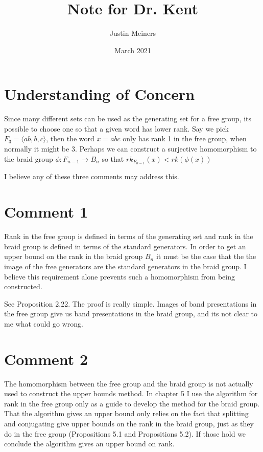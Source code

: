 \documentclass{article}
\title{Note for Dr. Kent}
\author{Justin Meiners}
\date{March 2021}
\begin{document}
\maketitle

\section*{Understanding of Concern}

Since many different sets can be used as the generating
set for a free group, its possible to choose
one so that a given word has lower rank.
Say we pick $F_{3} = \langle ab, b, c \rangle$,
then the word $x = abc$ only has rank 1 in the free group, when normally it might be 3.
Perhaps we can construct a surjective homomorphism to the braid group $\phi \colon F_{n-1} \rightarrow B_{n}$ 
so that $rk_{F_{n-1}}(x) < rk(\phi(x))$ 

I believe any of these three comments may address this. 

\section*{Comment 1}

Rank in the free group is defined in terms of the generating set
and rank in the braid group is defined in terms of the standard generators.
In order to get an upper bound on the rank in the braid 
group $B_{n}$ it must be the case
that the the image of the free generators
are the standard generators in the braid group.
I believe this requirement alone prevents such
a homomorphism from being constructed.

See Proposition 2.22.
The  proof is really simple.
Images of band presentations in the free group give us band presentations in the braid group, and its not clear to me what could go wrong.

\section*{Comment 2}

The homomorphism between the free group and the braid group is not actually used to construct the upper bounds method.
In chapter 5 I use the algorithm for rank in the free group only as a guide to develop the method for the braid group.
That the algorithm gives an upper bound only relies on the fact that splitting and conjugating give upper bounds on the rank in the braid group, just as they do in the free group
(Propositions 5.1 and Propositions 5.2).
If those hold we conclude the algorithm
gives an upper bound on rank.
\end{document}

